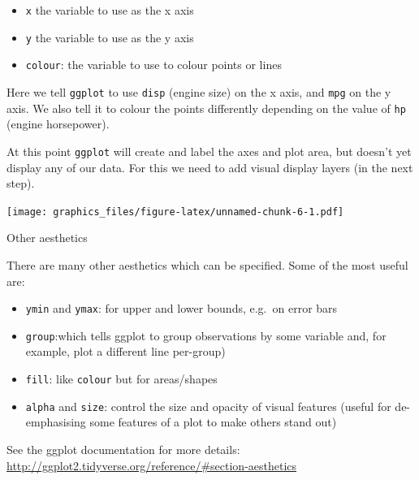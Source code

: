 \documentclass[]{article}
\newenvironment{Shaded}{\begin{snugshade}}{\end{snugshade}}
\newcommand{\DataTypeTok}[1]{\textcolor[rgb]{0.13,0.29,0.53}{#1}}
\newcommand{\KeywordTok}[1]{\textcolor[rgb]{0.13,0.29,0.53}{\textbf{#1}}}
\newcommand{\NormalTok}[1]{#1}
\newcommand{\OperatorTok}[1]{\textcolor[rgb]{0.81,0.36,0.00}{\textbf{#1}}}
\newcommand{\StringTok}[1]{\textcolor[rgb]{0.31,0.60,0.02}{#1}}
\providecommand{\tightlist}{%
  \setlength{\itemsep}{0pt}\setlength{\parskip}{0pt}}
\begin{document}
\begin{itemize}
\tightlist
\item
  \texttt{x} the variable to use as the x axis
\item
  \texttt{y} the variable to use as the y axis
\item
  \texttt{colour}: the variable to use to colour points or lines
\end{itemize}

Here we tell \texttt{ggplot} to use \texttt{disp} (engine size) on the x axis, and \texttt{mpg} on
the y axis. We also tell it to colour the points differently depending on the
value of \texttt{hp} (engine horsepower).

At this point \texttt{ggplot} will create and label the axes and plot area, but doesn't
yet display any of our data. For this we need to add visual display layers (in
the next step).

\begin{Shaded}
\end{Shaded}

\texttt{[image: graphics\_files/figure-latex/unnamed-chunk-6-1.pdf]}

Other aesthetics

There are many other aesthetics which can be specified. Some of the most useful
are:

\begin{itemize}
\tightlist
\item
  \texttt{ymin} and \texttt{ymax}: for upper and lower bounds, e.g.~on error bars
\item
  \texttt{group}:which tells ggplot to group observations by some variable and, for
  example, plot a different line per-group)
\item
  \texttt{fill}: like \texttt{colour} but for areas/shapes
\item
  \texttt{alpha} and \texttt{size}: control the size and opacity of visual features (useful
  for de-emphasising some features of a plot to make others stand out)
\end{itemize}

See the ggplot documentation for more details:
\url{http://ggplot2.tidyverse.org/reference/\#section-aesthetics}
\end{document}
